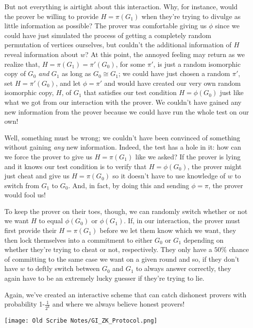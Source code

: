 		But not everything is airtight about this interaction.  Why, for instance, would the prover be willing to provide $H=\pi(G_1)$ when they're trying to divulge as little information as possible?  The prover was comfortable giving us $\phi$ since we could have just simulated the process of getting a completely random permutation of vertices ourselves, but couldn't the additional information of $H$ reveal information about $w$?  At this point, the annoyed feeling may return as we realize that, $H=\pi(G_1)=\pi'(G_0)$, for some $\pi'$, is just a random isomorphic copy of $G_0$ \textit{and} $G_1$ as long as $G_0 \cong G_1$; we could have just chosen a random $\pi'$, set $H=\pi'(G_0)$, and let $\phi=\pi'$ and would have created our very own random isomorphic copy, $H$, of $G_1$ that satisfies our test condition $H=\phi(G_0)$ just like what we got from our interaction with the prover.  We couldn't have gained any new information from the prover because we could have run the whole test on our own!
		
		Well, something must be wrong; we couldn't have been convinced of something without gaining \textit{any} new information.  Indeed, the test has a hole in it: how can we force the prover to give us $H=\pi(G_1)$ like we asked?  If the prover is lying and it knows our test condition is to verify that $H=\phi(G_0)$, the prover might just cheat and give us $H=\pi(G_0)$ so it doesn't have to use knowledge of $w$ to switch from $G_1$ to $G_0$.  And, in fact, by doing this and sending $\phi=\pi$, the prover would fool us!
		
		To keep the prover on their toes, though, we can randomly switch whether or not we want $H$ to equal $\phi(G_0)$ or $\phi(G_1)$.  If, in our interaction, the prover must first provide their $H=\pi(G_1)$ before we let them know which we want, they then lock themselves into a commitment to either $G_0$ or $G_1$ depending on whether they're trying to cheat or not, respectively.  They only have a $50\%$ chance of committing to the same case we want on a given round and so, if they don't have $w$ to deftly switch between $G_0$ and $G_1$ to always answer correctly, they again have to be an extremely lucky guesser if they're trying to lie.
		
		Again, we've created an interactive scheme that can catch dishonest provers with probability 1-$\frac{1}{2^k}$ and where we always believe honest provers!
		
		\begin{center}
			\texttt{[image: Old Scribe Notes/GI\_ZK\_Protocol.png]}
		\end{center}
		
